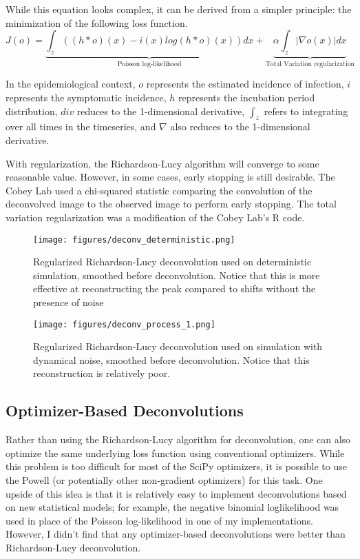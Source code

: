 \documentclass{article}
\begin{document}
While this equation looks complex, it can be derived from a simpler principle: the minimization of the following loss function. 
\begin{equation}
    J(o) = \underbrace{\int_z ((h*o)(x) - i(x) log(h*o)(x))dx}_{\mbox{Poisson log-likelihood}} + \underbrace{\alpha \int_z |\nabla o(x)| dx}_{\mbox{Total Variation regularization}}
\end{equation}


In the epidemiological context, $o$ represents the estimated incidence of infection, $i$ represents the symptomatic incidence, $h$ represents the incubation period distribution, $div$ reduces to the 1-dimensional derivative,  $\int_z$ refers to integrating over all times in the timeseries, and $\nabla$ also reduces to the 1-dimensional derivative.

With regularization, the Richardson-Lucy algorithm will converge to some reasonable value. However, in some cases, early stopping is still desirable. The Cobey Lab used a chi-squared statistic comparing the convolution of the deconvolved image to the observed image to perform early stopping. The total variation regularization was a modification of the Cobey Lab's R code.

\clearpage
\begin{figure}[h!]
    \centering
    \texttt{[image: figures/deconv\_deterministic.png]}
    \caption{Regularized Richardson-Lucy deconvolution used on deterministic simulation, smoothed before deconvolution. Notice that this is more effective at reconstructing the peak compared to shifts without the presence of noise}
    \label{fig:my_label}
\end{figure}

\clearpage
\begin{figure}[h!]
    \centering
    \texttt{[image: figures/deconv\_process\_1.png]}
    \caption{Regularized Richardson-Lucy deconvolution used on simulation with dynamical noise, smoothed before deconvolution. Notice that this reconstruction is relatively poor.}
    \label{fig:my_label}
\end{figure}

\subsection{Optimizer-Based Deconvolutions}
Rather than using the Richardson-Lucy algorithm for deconvolution, one can also optimize the same underlying loss function using conventional optimizers. While this problem is too difficult for most of the SciPy optimizers, it is possible to use the Powell (or potentially other non-gradient optimizers) for this task. One upside of this idea is that it is relatively easy to implement deconvolutions based on new statistical models; for example, the negative binomial loglikelihood was used in place of the Poisson log-likelihood in one of my implementations. However, I didn't find that any optimizer-based deconvolutions were better than Richardson-Lucy deconvolution.
\end{document}
